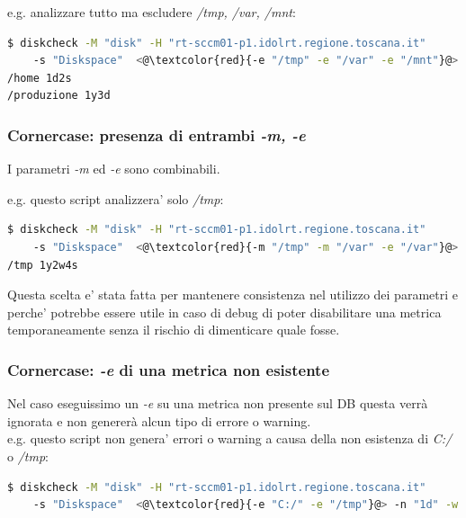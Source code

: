 \documentclass{article}
\begin{document}
e.g. analizzare tutto ma escludere \textit{/tmp, /var, /mnt}: 
\begin{lstlisting}[language=Bash]
$ diskcheck -M "disk" -H "rt-sccm01-p1.idolrt.regione.toscana.it" 
    -s "Diskspace"  <@\textcolor{red}{-e "/tmp" -e "/var" -e "/mnt"}@> -n "1d" -w "4w" -c "1w"
/home 1d2s
/produzione 1y3d
\end{lstlisting}

\subsubsection*{Cornercase: presenza di entrambi \textit{-m, -e}}

I parametri \textit{-m} ed \textit{-e} sono combinabili.

e.g. questo script analizzera' solo \textit{/tmp}: 
\begin{lstlisting}[language=Bash]
$ diskcheck -M "disk" -H "rt-sccm01-p1.idolrt.regione.toscana.it" 
    -s "Diskspace"  <@\textcolor{red}{-m "/tmp" -m "/var" -e "/var"}@> -n "1d" -w "4w" -c "1w"
/tmp 1y2w4s
\end{lstlisting}

Questa scelta e' stata fatta per mantenere consistenza nel utilizzo dei parametri e perche' potrebbe essere utile in caso di debug di poter disabilitare una metrica temporaneamente senza il rischio di dimenticare quale fosse.

\subsubsection*{Cornercase: \textit{-e} di una metrica non esistente}
Nel caso eseguissimo un \textit{-e} su una metrica non presente sul DB questa verrà ignorata e non genererà alcun tipo di errore o warning.
\\
e.g. questo script non genera' errori o warning a causa della non esistenza di \textit{C:/} o \textit{/tmp}: 
\begin{lstlisting}[language=Bash]
$ diskcheck -M "disk" -H "rt-sccm01-p1.idolrt.regione.toscana.it" 
    -s "Diskspace"  <@\textcolor{red}{-e "C:/" -e "/tmp"}@> -n "1d" -w "4w" -c "1w"
\end{lstlisting}
\end{document}
